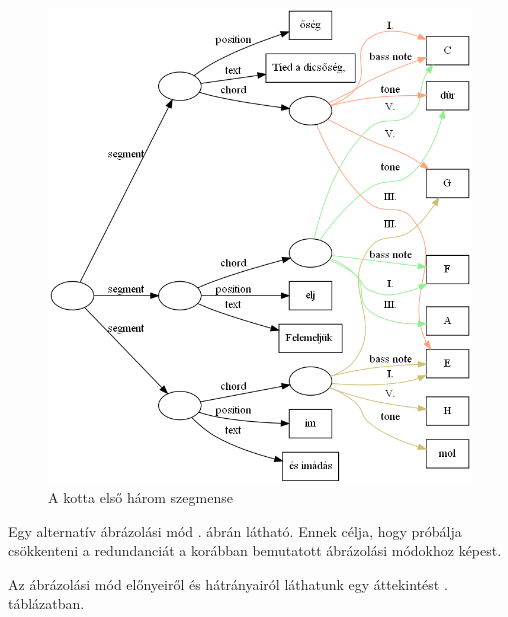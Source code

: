 \begin{figure}[h]
	\centering
	\includegraphics[scale=0.45]{images/img_src/representation_of_sheet.png}
	\caption{A kotta első három szegmense}
	\label{fig:repres1}
\end{figure}


Egy alternatív ábrázolási mód . ábrán látható. Ennek célja, hogy próbálja csökkenteni a redundanciát a korábban bemutatott ábrázolási módokhoz képest.

Az ábrázolási mód előnyeiről és hátrányairól láthatunk egy áttekintést . táblázatban.

